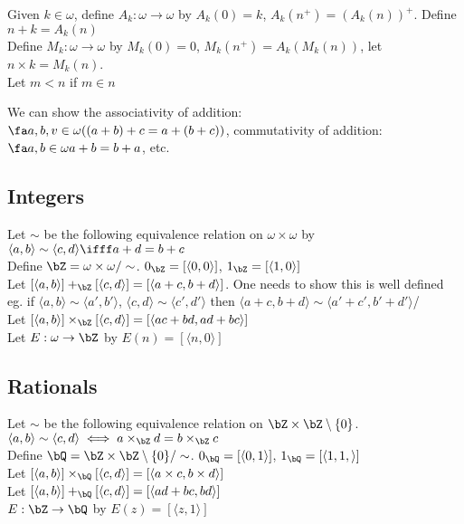 \begin{definition}
    Given $k \in \omega$, define $A_k :\omega \to \omega$ by $A_k(0)=k$, $A_k(n^+) = (A_k(n))^+$. Define $n+k = A_k(n)$ \\
    Define $M_k: \omega \to \omega$ by $M_k(0)=0$, $M_k(n^+) = A_k(M_k(n))$, let $n \times k = M_k(n)$.\\
    Let $m < n$ if $m \in n$
\end{definition}

\begin{theorem}
    We can show the associativity of addition: $\fa a, b, v \in \omega ((a+b)+c = a + (b+c))$, commutativity of addition: $ \fa a, b \in \omega a+b=b+a$, etc. 
\end{theorem}

\subsection{Integers}

Let $\sim$ be the following equivalence relation on $\omega \times \omega$ by $\langle a , b \rangle \sim \langle c , d \rangle \ifff a+d = b+c$ \\
Define $\bZ = \omega \times \omega / \sim$. $0_{\bZ} = [\langle 0, 0 \rangle]$, $1_{\bZ} = [\langle 1, 0 \rangle]$ \\
Let $[\langle a, b \rangle] +_{\bZ} [\langle c , d \rangle] = [\langle a + c, b+d \rangle]$. One needs to show this is well defined eg. if $\langle a, b \rangle \sim \langle a', b' \rangle$, $\langle c, d \rangle \sim \langle c', d' \rangle$ then $\langle a + c, b+d \rangle \sim \langle a' + c', b' + d' \rangle$/ \\
Let $[ \langle a, b\rangle] \times_{\bZ} [\langle c, d \rangle] = [\langle ac + bd, ad+bc \rangle]$ \\
Let $E: \omega \to \bZ$ by $E(n) = [\langle n, 0 \rangle]$ 

\subsection{Rationals}

Let $\sim$ be the following equivalence relation on $\bZ \times \bZ \setminus \{0\}$. $\langle a, b \rangle \sim \langle c , d \rangle \iff a \times_{\bZ} d = b \times_{\bZ} c$ \\
Define $\bQ = \bZ \times \bZ \setminus \{0\} / \sim$. $0_{\bQ} = [\langle 0, 1 \rangle]$, $1_{\bQ} = [ \langle 1, 1, \rangle]$ \\
Let $[\langle a, b \rangle] \times_{\bQ} [\langle c, d \rangle] = [\langle a \times c, b \times d \rangle]$ \\
Let $[\langle a, b \rangle] +_{\bQ} [\langle c, d \rangle] = [\langle ad  +bc, bd \rangle]$ \\
$E: \bZ \to \bQ$ by $E(z) = [\langle z, 1 \rangle]$ 